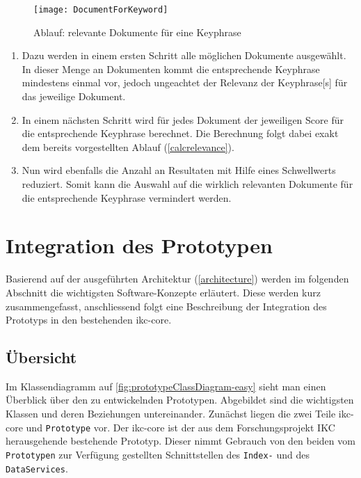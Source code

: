     \begin{figure}[H]
    \centering
    \texttt{[image: DocumentForKeyword]}
    \caption{Ablauf: relevante Dokumente für eine \gls{Keyphrase}}
    \label{fig:seqdocforkeyword}
    \end{figure}
\begin{enumerate}
    \item Dazu werden in einem ersten Schritt alle möglichen Dokumente ausgewählt. In dieser Menge an Dokumenten kommt die entsprechende \gls{Keyphrase} mindestens einmal vor, jedoch ungeachtet der Relevanz der \gls{Keyphrase}[s] für das jeweilige Dokument.
    \item In einem nächsten Schritt wird für jedes Dokument der jeweiligen \gls{Score} für die entsprechende \gls{Keyphrase} berechnet. Die Berechnung folgt dabei exakt dem bereits vorgestellten Ablauf (\autoref{calcrelevance}).

    \item Nun wird ebenfalls die Anzahl an Resultaten mit Hilfe eines Schwellwerts reduziert. Somit kann die Auswahl auf die wirklich relevanten Dokumente für die entsprechende \gls{Keyphrase} vermindert werden.
            
\end{enumerate}


\section{Integration des Prototypen}\label{Integration}


Basierend auf der ausgeführten Architektur (\autoref{architecture}) werden im folgenden Abschnitt die wichtigsten Software-Konzepte erläutert. Diese werden kurz zusammengefasst, anschliessend folgt eine Beschreibung der Integration des Prototyps in den bestehenden \gls{ikc-core}.


\subsection{Übersicht}



Im Klassendiagramm auf \autoref{fig:prototypeClassDiagram-easy} sieht man einen Überblick über den zu entwickelnden Prototypen. Abgebildet sind die wichtigsten Klassen und deren Beziehungen untereinander. Zunächst liegen die zwei Teile \gls{ikc-core} und \texttt{Prototype} vor. Der \gls{ikc-core} ist der aus dem Forschungsprojekt \gls{IKC} herausgehende bestehende Prototyp. Dieser nimmt Gebrauch von den beiden vom \texttt{Prototypen} zur Verfügung gestellten Schnittstellen des \texttt{Index-} und des \texttt{DataServices}.

